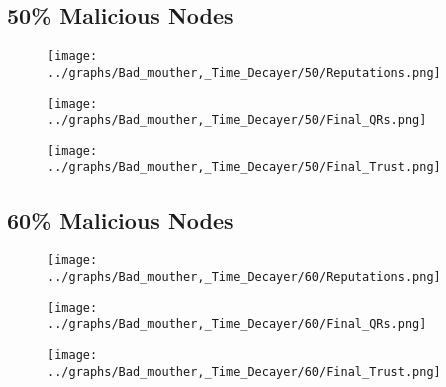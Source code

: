 \documentclass{article}
\begin{document}
  \begin{minipage}[t]{0.49\columnwidth}
    \subsection*{50\% Malicious Nodes}
        \begin{figure}[H]
            \centering
            \texttt{[image: ../graphs/Bad\_mouther,\_Time\_Decayer/50/Reputations.png]}
        \end{figure}
        \begin{figure}[H]
            \centering
            \texttt{[image: ../graphs/Bad\_mouther,\_Time\_Decayer/50/Final\_QRs.png]}
        \end{figure}
    \end{minipage}
    \begin{minipage}[t]{0.49\columnwidth}
        \begin{figure}[H]
            \centering
            \texttt{[image: ../graphs/Bad\_mouther,\_Time\_Decayer/50/Final\_Trust.png]}
        \end{figure}
    \end{minipage}

  \begin{minipage}[t]{0.49\columnwidth}
    \subsection*{60\% Malicious Nodes}
        \begin{figure}[H]
            \centering
            \texttt{[image: ../graphs/Bad\_mouther,\_Time\_Decayer/60/Reputations.png]}
        \end{figure}
        \begin{figure}[H]
            \centering
            \texttt{[image: ../graphs/Bad\_mouther,\_Time\_Decayer/60/Final\_QRs.png]}
        \end{figure}
    \end{minipage}
    \begin{minipage}[t]{0.49\columnwidth}
        \begin{figure}[H]
            \centering
            \texttt{[image: ../graphs/Bad\_mouther,\_Time\_Decayer/60/Final\_Trust.png]}
        \end{figure}
    \end{minipage}
\end{document}
